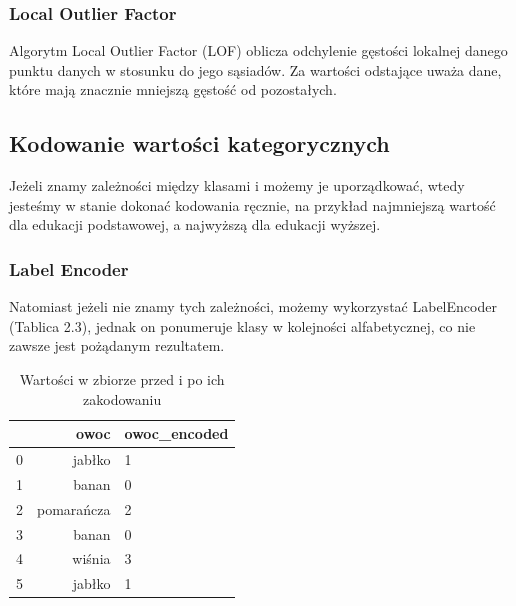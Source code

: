 \documentclass[oneside]{book}
\begin{document}
\subsubsection*{Local Outlier Factor}
Algorytm Local Outlier Factor (LOF)  oblicza odchylenie 
gęstości lokalnej danego punktu danych w stosunku do 
jego sąsiadów. Za wartości odstające uważa dane, które 
mają znacznie mniejszą gęstość od pozostałych.

\subsection*{Kodowanie wartości kategorycznych}
Jeżeli znamy zależności między klasami i możemy je uporządkować, 
wtedy jesteśmy w stanie dokonać kodowania ręcznie, na przykład 
najmniejszą wartość dla edukacji podstawowej, a najwyższą dla 
edukacji wyższej.
\subsubsection*{Label Encoder}
Natomiast jeżeli nie znamy tych zależności, 
możemy wykorzystać LabelEncoder (Tablica 2.3), jednak on ponumeruje klasy w 
kolejności alfabetycznej, co nie zawsze jest pożądanym rezultatem. 

\begin{table}[H]
    \begin{center}
    \begin{tabular}{|r|r|l|}
    \hline
    \textbf{} & \textbf{owoc} & \multicolumn{1}{r|}{\textbf{owoc\_encoded}} \\ \hline
    0         & jabłko        & 1                                           \\ \hline
    1         & banan         & 0                                           \\ \hline
    2         & pomarańcza    & 2                                           \\ \hline
    3         & banan         & 0                                           \\ \hline
    4         & wiśnia        & 3                                           \\ \hline
    5         & jabłko        & 1                                           \\ \hline
    \end{tabular}
    \caption{Wartości w zbiorze przed i po ich zakodowaniu}
    \end{center}
    \end{table}
\end{document}
